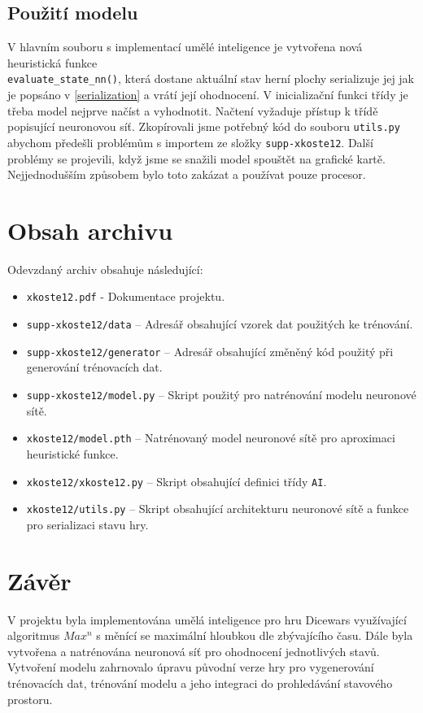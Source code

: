 \documentclass[a4paper,11pt]{article}
\begin{document}
	\subsection{Použití modelu}
		V hlavním souboru s implementací umělé inteligence je vytvořena nová heuristická funkce\\\texttt{evaluate\_state\_nn()}, která dostane aktuální stav herní plochy serializuje jej jak je popsáno v \ref{serialization} a vrátí její ohodnocení. V inicializační funkci třídy je třeba model nejprve načíst a vyhodnotit. Načtení vyžaduje přístup k třídě popisující neuronovou síť. Zkopírovali jsme potřebný kód do souboru \texttt{utils.py} abychom předešli problémům s importem ze složky \texttt{supp-xkoste12}. Další problémy se projevili, když jsme se snažili model spouštět na grafické kartě. Nejjednodušším způsobem bylo toto zakázat a používat pouze procesor.
	
	\section{Obsah archivu}
		Odevzdaný archiv obsahuje následující:
		
		\begin{itemize}
			\item \texttt{xkoste12.pdf} - Dokumentace projektu.
			\item \texttt{supp-xkoste12/data} -- Adresář obsahující vzorek dat použitých ke trénování.
			\item \texttt{supp-xkoste12/generator} -- Adresář obsahující změněný kód použitý při generování trénovacích dat.
			\item \texttt{supp-xkoste12/model.py} -- Skript použitý pro natrénování modelu neuronové sítě.
			\item \texttt{xkoste12/model.pth} -- Natrénovaný model neuronové sítě pro aproximaci heuristické funkce.
			\item \texttt{xkoste12/xkoste12.py} -- Skript obsahující definici třídy \texttt{AI}.
			\item \texttt{xkoste12/utils.py} -- Skript obsahující architekturu neuronové sítě a funkce pro serializaci stavu hry.
		\end{itemize}
		
	\section{Závěr}
	V projektu byla implementována umělá inteligence pro hru Dicewars využívající algoritmus \texttt{$Max^n$} s měnící se maximální hloubkou dle zbývajícího času. Dále byla vytvořena a natrénována neuronová síť pro ohodnocení jednotlivých stavů. Vytvoření modelu zahrnovalo úpravu původní verze hry pro vygenerování trénovacích dat, trénování modelu a jeho integraci do prohledávání stavového prostoru.
	
\end{document}
